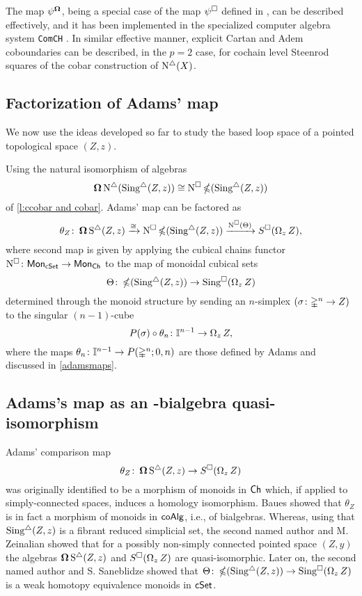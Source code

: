 The map $\psi^{\operatorname{\mathbf{\Omega}}}$, being a special case of the map $\psi^\square$ defined in \cite{medina2020maysteenrod}, can be described effectively, and it has been implemented in the specialized computer algebra system \texttt{ComCH} \cite{medina2021computer}.
In similar effective manner, explicit Cartan and Adem coboundaries \cite{medina2020cartan, medina2020adem} can be described, in the $p = 2$ case, for cochain level Steenrod squares of the cobar construction of $\operatorname{N^{\triangle}}(X)$.

\subsection{Factorization of Adams' map} \label{ss:factorization of adams}

We now use the ideas developed so far to study the based loop space of a pointed topological space $(Z, z)$.

Using the natural isomorphism of algebras
\[
\operatorname{\mathbf{\Omega}} \operatorname{N^{\triangle}} (\operatorname{Sing^{\triangle}}(Z, z)) \cong \operatorname{N^{\square}} \operatorname{\mathbb{\Omega}} (\operatorname{Sing^{\triangle}}(Z, z))
\]
of \cref{l:ccobar and cobar}.
Adams' map can be factored as
\begin{equation} \label{e:factorization of adams}
\theta_Z \colon \operatorname{\mathbf{\Omega}} \operatorname{S^{\triangle}}(Z, z) \xrightarrow{\cong}
\operatorname{N^{\square}} \operatorname{\mathbb{\Omega}}(\operatorname{Sing^{\triangle}}(Z, z)) \xrightarrow{\operatorname{N^{\square}}(\Theta)}
S^{\square}(\operatorname{\Omega}_z Z),
\end{equation}
where second map is given by applying the cubical chains functor $\operatorname{N^{\square}} \colon \mathsf{Mon}_{\mathsf{cSet}} \to \mathsf{Mon}_{\mathsf{Ch}}$ to the map of monoidal cubical sets
\[
\Theta \colon \operatorname{\mathbb{\Omega}}(\operatorname{Sing^{\triangle}}(Z, z)) \to \operatorname{Sing^{\square}}(\operatorname{\Omega}_z Z)
\]
determined through the monoid structure by sending an $n$-simplex $(\sigma \colon \mathbb{\Delta}^n \to Z)$ to the singular $(n-1)$-cube
\[
P(\sigma) \circ \theta_n \colon \mathbb{I}^{n-1} \to \operatorname{\Omega}_z Z,
\]
where the maps $\theta_n \colon \mathbb{I}^{n-1} \to P(\mathbb{\Delta}^n;0,n)$ are those defined by Adams and discussed in \cref{adamsmaps}.

\subsection{Adams's map as an \pdfEinfty-bialgebra quasi-isomorphism}

Adams' comparison map
\[
\theta_Z \colon \operatorname{\mathbf{\Omega}} \operatorname{S^{\triangle}}(Z, z) \to S^{\square}(\operatorname{\Omega}_z Z)
\]
was originally identified to be a morphism of monoids in $\mathsf{Ch}$ which, if applied to simply-connected spaces, induces a homology isomorphism.
Baues showed that $\theta_Z$ is in fact a morphism of monoids in $\mathsf{coAlg}$, i.e., of bialgebras.
Whereas, using that $\operatorname{Sing^{\triangle}}(Z, z)$ is a fibrant reduced simplicial set, the second named author and M. Zeinalian \cite{rivera2018cubical} showed that for a possibly non-simply connected pointed space $(Z,y)$ the algebras $\operatorname{\mathbf{\Omega}} \operatorname{S^{\triangle}}(Z, z)$ and $S^{\square}(\operatorname{\Omega}_zZ)$ are quasi-isomorphic.
Later on, the second named author and S. Saneblidze
\cite{rivera2019path} showed that $\Theta \colon \operatorname{\mathbb{\Omega}}(\operatorname{Sing^{\triangle}}(Z, z)) \to \operatorname{Sing^{\square}}(\operatorname{\Omega}_z Z)$ is a weak homotopy equivalence monoids in $\mathsf{cSet}$.

